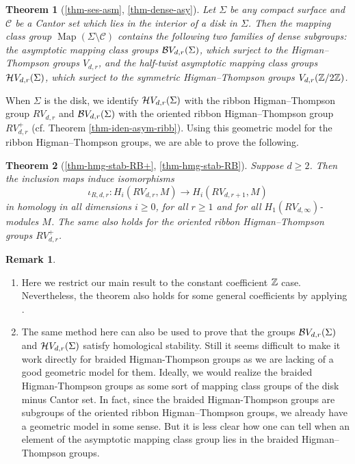 \documentclass[11pt, a4paper]{amsart}
\newtheorem*{thm*}{Theorem}
\theoremstyle{definition}
\newtheorem*{rem*}{Remark}
\newcommand{\CC}{{\mathcal {C}}}
\DeclareMathOperator{\Map}{Map}
\begin{document}
\begin{thm*}[\ref{thm-ses-asm}, \ref{thm-dense-asy}]
Let $\Sigma$ be any compact surface and $\CC$ be a Cantor set which lies in the interior of a disk in $\Sigma$. Then the mapping class group $\Map(\Sigma\setminus \CC)$ contains the following two families of dense subgroups: the asymptotic mapping class groups ${\mathcal {B}} V_{d,r}(\Sigma)$, which surject to the Higman--Thompson groups $V_{d,r}$, and the half-twist asymptotic mapping class groups ${\mathcal {H}} V_{d,r}(\Sigma)$, which surject to the symmetric Higman--Thompson groups $V_{d,r}({\mathbb {Z}}/2{\mathbb {Z}})$.  
\end{thm*}

When $\Sigma$ is the disk, we identify ${\mathcal {H}} V_{d,r}(\Sigma)$ with the ribbon Higman--Thompson group $RV_{d,r}$ and ${\mathcal {B}} V_{d,r}(\Sigma)$  with the oriented ribbon Higman--Thompson group $RV^+_{d,r}$ (cf. Theorem \ref{thm-iden-asym-ribb}). Using this geometric model for the  ribbon Higman--Thompson groups, we are able to prove the following. 


\begin{thm*}[\ref{thm-hmg-stab-RB+}, \ref{thm-hmg-stab-RB}]
Suppose $d\geq 2$. Then the inclusion maps induce isomorphisms
$$ \iota_{R,d,r}: H_i(RV_{d,r},M) \to H_i(RV_{d,r+1},M)$$
in homology in all dimensions $i \geq 0$, for all $r \geq  1$ and for all $H_1(RV_{d,\infty})$-modules $M$. The same also holds for the oriented  ribbon Higman--Thompson groups $RV_{d,r}^+$.
\end{thm*}
\begin{rem*}
\begin{enumerate}
\item Here we restrict our main result to the constant coefficient ${\mathbb {Z}}$ case. Nevertheless,
the theorem also holds for some general coefficients by applying \cite[Theorem A]{RWW17}. 

\item  The same method here can also be used to prove that the groups ${\mathcal {B}} V_{d,r}(\Sigma)$ and ${\mathcal {H}} V_{d,r}(\Sigma)$ satisfy homological stability. Still it seems difficult to make it work directly for braided Higman-Thompson groups as we are lacking of a good geometric model for them. Ideally, we would realize the braided Higman-Thompson groups as some sort of mapping class groups of the disk minus Cantor set. In fact, since  the braided Higman-Thompson groups are subgroups of the oriented  ribbon Higman--Thompson groups, we  already have a geometric model in some sense. But it is less clear how one can tell when an element of the asymptotic mapping class group lies in the braided  Higman--Thompson groups.

\end{enumerate}
\end{rem*}
\end{document}
